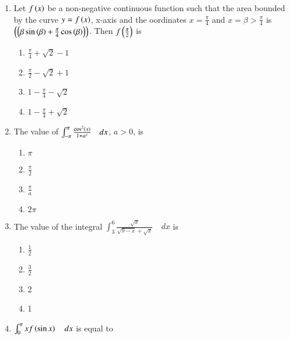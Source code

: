 \documentclass[journal]{IEEEtran}
\begin{document}
\begin{enumerate}
\begin{enumerate}
		     \end{enumerate}  
	     \item 
		      Let $f\left(x\right)$ be a non-negative continuous function such that the area bounded by the curve $y=f\left(x\right)$, x-axis and the oordinates $x=\frac{\pi}{4}$ and $x=\beta>\frac{\pi}{4}$ is $\left(\left(\beta \sin\left(\beta\right)+\frac{\pi}{4}\cos\left(\beta\right)\right)\right)$. Then $f\left(\frac{\pi}{2}\right)$ is
		     \hfill {}
		     \begin{enumerate}
		            \item $\frac{\pi}{4}+\sqrt{2}-1$
		            \item $\frac{\pi}{2}-\sqrt{2}+1$
		            \item $1-\frac{\pi}{4}-\sqrt{2}$
		            \item $1-\frac{\pi}{4}+\sqrt{2}$
		     \end{enumerate}
	     \item 
		      The value of $\int_{-\pi}^{\pi} \frac{\cos^{2}\left(x\right)}{1+a^{x}} \quad dx$, $a>0$, is
		     \hfill {}
		     \begin{enumerate}
		           \item $\pi$
		           \item $\frac{\pi}{2}$
		           \item $\frac{\pi}{a}$
		           \item $2\pi$
		     \end{enumerate}
	     \item 
		     The value of the integral $\int_{3}^{6} \frac{\sqrt{x}}{\sqrt{9-x}+\sqrt{x}} \quad dx$ is \quad \quad \quad
       \quad \quad
		     \hfill {} 
		    \begin{enumerate}
		     
		          \item $\frac{1}{2}$
		          \item $\frac{3}{2}$
		          \item 2
		          \item 1
		    \end{enumerate}
	     \item 
		     $\int_{0}^{\pi} xf\left(\sin x\right) \quad dx$ is equal to 
		    \hfill {}
		    \begin{enumerate}
		    

\end{enumerate}
\end{enumerate}
\end{document}
